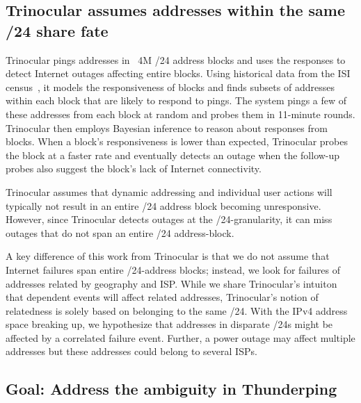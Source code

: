 \subsection{Trinocular assumes addresses within the same /24 share fate}



Trinocular pings addresses in ~4M /24 address blocks and
uses the responses to detect Internet outages affecting entire blocks. Using historical
data from the ISI census~\cite{census-survey}, it models the responsiveness of
blocks and finds subsets of addresses within each block that are
likely to respond to pings. The system pings a few of these addresses
from each block at random and probes them in 11-minute
rounds. Trinocular then employs Bayesian inference to reason about
responses from blocks. When a block's responsiveness is lower than
expected, Trinocular probes the block at a faster rate and eventually
detects an outage when the follow-up probes also suggest the block's
lack of Internet connectivity.

Trinocular assumes that dynamic addressing and individual user actions
will typically not result
in an entire /24 address block becoming unresponsive. However, since
Trinocular detects outages at the /24-granularity, it can miss outages
that do not span an entire /24 address-block. 

A key difference of this work from Trinocular is that we do not assume
that Internet failures span entire /24-address blocks; instead, we
look for failures of addresses related by geography and
ISP.  While we share Trinocular's intuiton that dependent events will
affect related addresses, Trinocular's notion of relatedness is solely
based on belonging to the same /24. With the IPv4 address space
breaking up, we hypothesize that addresses in disparate /24s might be
affected by a correlated failure event. Further, a power outage may
affect multiple addresses but these addresses could belong to several ISPs.

\subsection{Goal: Address the ambiguity in Thunderping}

